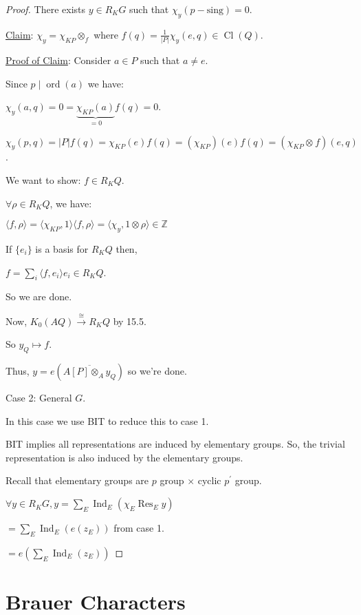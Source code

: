 \documentclass{article}
\theoremstyle{definition}
\begin{document}
\begin{proof}
    There exists \(y\in R_K G\) such that \(\chi_y(p-\text{sing}) = 0\).
    
    \underline{Claim}: \(\chi_y = \chi_{KP} \otimes_{f}\) where \(f(q) = \frac{1}{\vert P \vert} \chi_y(e,q) \in \operatorname{Cl} (Q)\).
    
    \underline{Proof of Claim}: Consider \(a\in P\) such that \(a \neq e\).

    Since \(p\mid \operatorname{ord}(a)\) we have:

    \(\chi_y(a,q) = 0 = \underbrace{\chi_{KP}(a)}_{=0} f(q) = 0\).
    
    \(\chi_y(p,q) = \vert P \vert f(q) = \chi_{KP}(e) f(q) = (\chi_{KP})(e)f(q) = (\chi_{KP}\otimes_{} f)(e,q)\).
    
    We want to show: \(f\in R_K Q\).
    
    \(\forall \rho\in R_K Q\), we have:

    \(\langle f,\rho \rangle = \langle \chi_{KP}, 1 \rangle \langle f, \rho \rangle  = \langle\chi_y, 1 \otimes \rho \rangle \in \mathbb{Z}\) 

    If \(\{ e_i \} \) is a basis for \(R_K Q\) then,

    \(f = \sum_{i} \langle f, e_i \rangle e_i \in R_K Q\).

    So we are done.

    Now, \(K_0(AQ) \overset{\cong}{\to} R_K Q\) by 15.5.
    
    So \(y_Q \mapsto f\).

    Thus, \(y = e(\overline{A[P] \otimes_{A} y_Q} )\) so we're done.

    Case 2: General \(G\).

    In this case we use BIT to reduce this to case 1.

    BIT implies all representations are induced by elementary groups. So, the trivial representation is also induced by the elementary groups.

    Recall that elementary groups are \(p\) group \(\times\) cyclic \(p^{\prime}\) group.

    \(\forall y\in R_K G, y = \sum_{E} \operatorname{Ind}_E (\chi_E \operatorname{Res}_E y)\)
    
    \(= \sum_{E} \operatorname{Ind}_E (e(z_E))\) from case 1.

    \(= e \left( \sum_{E} \operatorname{Ind}_E(z_E) \right) \) 

\end{proof}

\section*{Brauer Characters}
\end{document}

